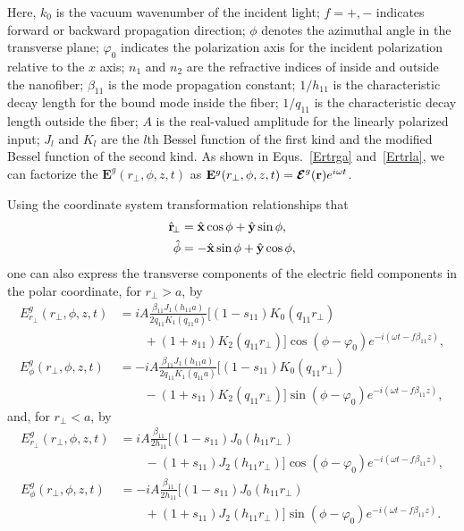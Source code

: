 Here, $ k_0 $ is the vacuum wavenumber of the incident light; $ f=+,- $ indicates forward or backward propagation direction; $ \phi $ denotes the azimuthal angle in the transverse plane; $ \varphi_0 $ indicates the polarization axis for the incident polarization relative to the $ x  $ axis; $ n_1 $ and $ n_2 $ are the refractive indices of inside and outside the nanofiber; $ \beta_{11} $ is the mode propagation constant; $ 1/h_{11} $ is the characteristic decay length for the bound mode inside the fiber; $ 1/q_{11} $ is the characteristic decay length outside the fiber; $ A $ is the real-valued amplitude for the linearly polarized input; $ J_l $ and $ K_l  $ are the $ l $th Bessel function of the first kind and the modified Bessel function of the second kind. As shown in Equs.~\ref{Ertrga} and~\ref{Ertrla}, we can factorize the $ \mathbf{E}^g(r_\perp,\phi,z,t) $ as $ \mathbf{E}^g(r_\perp,\phi,z,t)= \boldsymbol{\mathcal{E}}^g(\mathbf{r})e^{i\omega t} $. 

Using the coordinate system transformation relationships that
\begin{align}
\hat{\mathbf{r}}\!_\perp &= \hat{\mathbf{x}}\cos\phi + \hat{\mathbf{y}}\sin\phi,\\
\hat{\phi} &= -\hat{\mathbf{x}}\sin\phi + \hat{\mathbf{y}}\cos\phi,
\end{align}
one can also express the transverse components of the electric field components in the polar coordinate, for $ r\!_\perp>a $, by
\begin{subequations}
\label{Erptlrga}
\begin{align}
E_{r\!_\perp}^g(r_\perp,\phi,z,t) &= iA \frac{\beta_{11}J_1(h_{11}a)}{2q_{11}K_1(q_{11}a)}[(1-s_{11})K_0(q_{11}r_\perp) \nonumber\\
&\qquad + (1+s_{11})K_2 (q_{11}r_\perp) ]\cos (\phi-\varphi_0) e^{-i(\omega t-f\beta_{11}z)},\\
E_\phi^g(r_\perp,\phi,z,t) &= -iA \frac{\beta_{11}J_1(h_{11}a)}{2q_{11}K_1(q_{11}a)}[(1-s_{11})K_0(q_{11}r_\perp) \nonumber\\
&\qquad - (1+s_{11})K_2 (q_{11}r_\perp) ]\sin (\phi-\varphi_0) e^{-i(\omega t-f\beta_{11}z)},
\end{align}
\end{subequations}
and, for $ r_\perp<a $, by
\begin{subequations}
\label{Ephirtlrla}
\begin{align}
E_{r\!_\perp}^g(r_\perp,\phi,z,t) &= iA \frac{\beta_{11}}{2h_{11}}[(1-s_{11})J_0(h_{11}r_\perp) \nonumber\\
&\qquad - (1+s_{11})J_2 (h_{11}r_\perp)  ]\cos (\phi-\varphi_0) e^{-i(\omega t-f\beta_{11}z)},\\
E_\phi^g(r_\perp,\phi,z,t) &= -iA \frac{\beta_{11}}{2h_{11}}[(1-s_{11})J_0(h_{11}r_\perp) \nonumber\\
&\qquad + (1+s_{11})J_2 (h_{11}r_\perp)  ]\sin (\phi-\varphi_0) e^{-i(\omega t-f\beta_{11}z)}.
\end{align}
\end{subequations}

